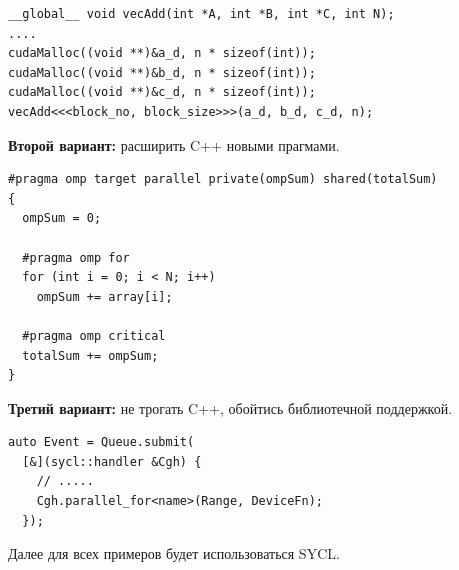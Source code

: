 \documentclass[a4paper,12pt,oneside]{article}
\begin{document}
\begin{lstlisting}[caption={Векторное сложение, CUDA},label={lst:cudavadd}]
__global__ void vecAdd(int *A, int *B, int *C, int N);
....
cudaMalloc((void **)&a_d, n * sizeof(int));
cudaMalloc((void **)&b_d, n * sizeof(int));
cudaMalloc((void **)&c_d, n * sizeof(int));
vecAdd<<<block_no, block_size>>>(a_d, b_d, c_d, n);
\end{lstlisting}

\textbf{Второй вариант:} расширить C++ новыми прагмами. 

\begin{lstlisting}[caption={Редукция, OpenMP},label={lst:ompred}]
#pragma omp target parallel private(ompSum) shared(totalSum)
{
  ompSum = 0;

  #pragma omp for
  for (int i = 0; i < N; i++)
    ompSum += array[i];

  #pragma omp critical
  totalSum += ompSum;
}
\end{lstlisting}

\textbf{Третий вариант:} не трогать C++, обойтись библиотечной поддержкой.

\begin{lstlisting}[caption={Выполнение DeviceFn, SYCL},label={lst:syclfn}]
auto Event = Queue.submit(
  [&](sycl::handler &Cgh) {
    // .....
    Cgh.parallel_for<name>(Range, DeviceFn);
  });
\end{lstlisting}

Далее для всех примеров будет использоваться SYCL.


\end{document}
